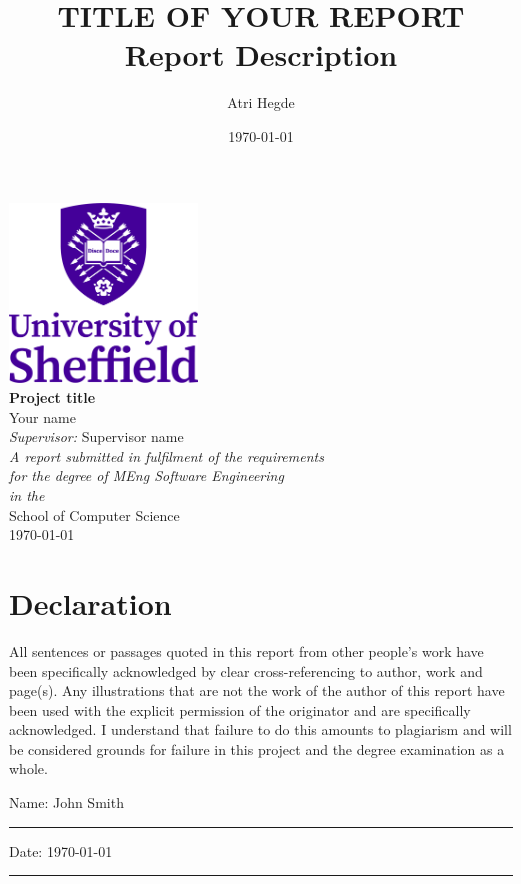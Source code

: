\documentclass[a4paper,11pt]{report}
\author{Atri Hegde}
\date{\today}
\title{TITLE OF YOUR REPORT\\\medskip
\large Report Description}
\begin{document}
\begin{titlepage}
\begin{center}
\includegraphics[width=5cm]{assets/uos_logo.png}\\[2cm]
\linespread{1.2}\huge {\bfseries Project title}\\[2cm]
\linespread{1}
{\Large Your name}\\[1cm]
{\large \emph{Supervisor:} Supervisor name}\\[1cm]
\large \emph{A report submitted in fulfilment of the requirements}\\ \emph{for the degree of MEng Software Engineering}\\[0.3cm] \textit{in the}\\[0.3cm] School of Computer Science\\[2cm]
\today
\end{center}
\end{titlepage}


\chapter*{\Large Declaration}

All sentences or passages quoted in this report from other people's work have been specifically acknowledged by clear cross-referencing to author, work and page(s). Any illustrations that are not the work of the author of this report have been used with the explicit permission of the originator and are specifically acknowledged. I understand that failure to do this amounts to plagiarism and will be considered grounds for failure in this project and the degree examination as a whole.



\noindent Name: John Smith \\[1mm]
\rule[1em]{25em}{0.5pt}

\noindent Date: \today \\[1mm]
\rule[1em]{25em}{0.5pt}
\end{document}
